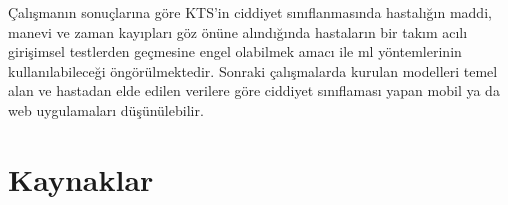 \documentclass[12pt,twoside]{deuthesis}
\begin{document}
\hfill\break

Çalışmanın sonuçlarına göre KTS'in ciddiyet sınıflanmasında hastalığın maddi, manevi ve zaman kayıpları göz önüne alındığında hastaların bir takım acılı girişimsel testlerden geçmesine engel olabilmek amacı ile ml yöntemlerinin kullanılabileceği öngörülmektedir. Sonraki çalışmalarda kurulan modelleri temel alan ve hastadan elde edilen verilere göre ciddiyet sınıflaması yapan mobil ya da web uygulamaları düşünülebilir.

\hypertarget{kaynaklar}{%
\chapter*{Kaynaklar}\label{kaynaklar}}

\end{document}
